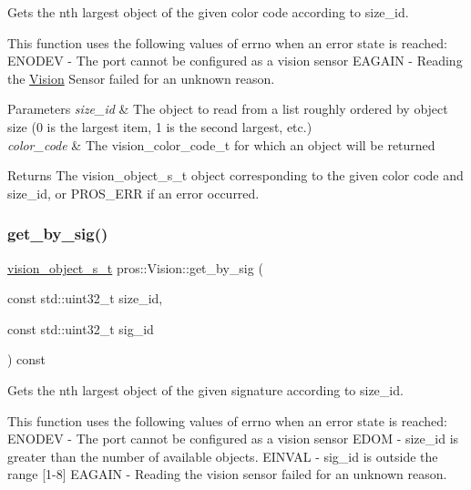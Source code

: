 Gets the nth largest object of the given color code according to size\+\_\+id. 

This function uses the following values of errno when an error state is reached\+: E\+N\+O\+D\+EV -\/ The port cannot be configured as a vision sensor E\+A\+G\+A\+IN -\/ Reading the \hyperlink{classpros_1_1Vision}{Vision} Sensor failed for an unknown reason.


\begin{DoxyParams}{Parameters}
{\em size\+\_\+id} & The object to read from a list roughly ordered by object size (0 is the largest item, 1 is the second largest, etc.) \\
\hline
{\em color\+\_\+code} & The vision\+\_\+color\+\_\+code\+\_\+t for which an object will be returned\\
\hline
\end{DoxyParams}
\begin{DoxyReturn}{Returns}
The vision\+\_\+object\+\_\+s\+\_\+t object corresponding to the given color code and size\+\_\+id, or P\+R\+O\+S\+\_\+\+E\+RR if an error occurred. 
\end{DoxyReturn}
\mbox{\label{classpros_1_1Vision_a10fd89ed3c5e8fe5ce25046a877c7d84}} 
\subsubsection{\texorpdfstring{get\+\_\+by\+\_\+sig()}{get\_by\_sig()}}
{\footnotesize\ttfamily \hyperlink{vision_8h_ae619120558539c13e53b5a6f42fb4375}{vision\+\_\+object\+\_\+s\+\_\+t} pros\+::\+Vision\+::get\+\_\+by\+\_\+sig (\begin{DoxyParamCaption}\item[{const std\+::uint32\+\_\+t}]{size\+\_\+id,  }\item[{const std\+::uint32\+\_\+t}]{sig\+\_\+id }\end{DoxyParamCaption}) const}



Gets the nth largest object of the given signature according to size\+\_\+id. 

This function uses the following values of errno when an error state is reached\+: E\+N\+O\+D\+EV -\/ The port cannot be configured as a vision sensor E\+D\+OM -\/ size\+\_\+id is greater than the number of available objects. E\+I\+N\+V\+AL -\/ sig\+\_\+id is outside the range \mbox{[}1-\/8\mbox{]} E\+A\+G\+A\+IN -\/ Reading the vision sensor failed for an unknown reason.


